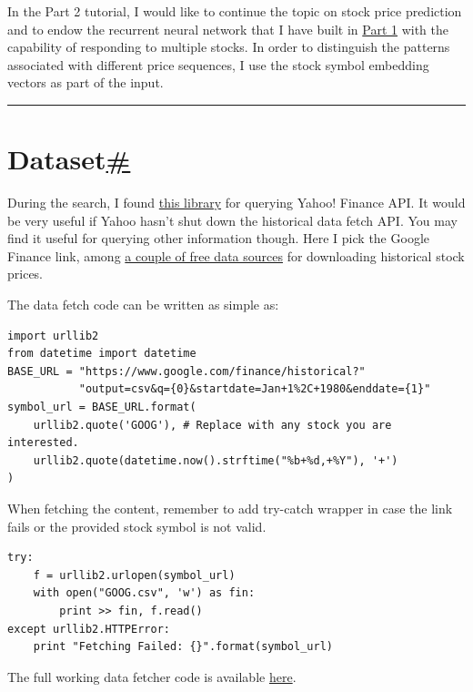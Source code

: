 
In the Part 2 tutorial, I would like to continue the topic on stock price prediction and to endow the recurrent neural network that I have built in \href{https://lilianweng.github.io/posts/2017-07-08-stock-rnn-part-1/}{Part 1} with the capability of responding to multiple stocks. In order to distinguish the patterns associated with different price sequences, I use the stock symbol embedding vectors as part of the input.

\begin{center}\rule{0.5\linewidth}{0.5pt}\end{center}

\section{\texorpdfstring{Dataset\hyperref[dataset]{\#}}{Dataset\#}}\label{dataset}

During the search, I found \href{https://github.com/lukaszbanasiak/yahoo-finance}{this library} for querying Yahoo! Finance API. It would be very useful if Yahoo hasn't shut down the historical data fetch API. You may find it useful for querying other information though. Here I pick the Google Finance link, among \href{https://www.quantshare.com/sa-43-10-ways-to-download-historical-stock-quotes-data-for-free}{a couple of free data sources} for downloading historical stock prices.

The data fetch code can be written as simple as:

\begin{verbatim}
import urllib2
from datetime import datetime
BASE_URL = "https://www.google.com/finance/historical?"
           "output=csv&q={0}&startdate=Jan+1%2C+1980&enddate={1}"
symbol_url = BASE_URL.format(
    urllib2.quote('GOOG'), # Replace with any stock you are interested.
    urllib2.quote(datetime.now().strftime("%b+%d,+%Y"), '+')
)
\end{verbatim}

When fetching the content, remember to add try-catch wrapper in case the link fails or the provided stock symbol is not valid.

\begin{verbatim}
try:
    f = urllib2.urlopen(symbol_url)
    with open("GOOG.csv", 'w') as fin:
        print >> fin, f.read()
except urllib2.HTTPError:
    print "Fetching Failed: {}".format(symbol_url)
\end{verbatim}

The full working data fetcher code is available \href{https://github.com/lilianweng/stock-rnn/blob/master/data_fetcher.py}{here}.

